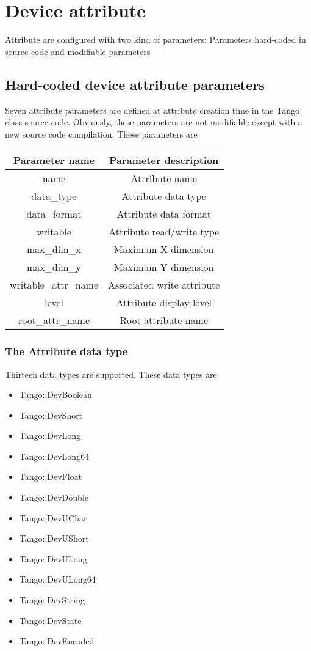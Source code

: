 \section{Device attribute}

Attribute are configured with two kind of parameters: Parameters hard-coded
in source code and modifiable parameters

\subsection{Hard-coded device attribute parameters}

Seven attribute parameters are defined at attribute
creation time in the Tango class source code. Obviously, these parameters
are not modifiable except with a new source code compilation. These
parameters are 

\vspace{0.3cm}

\begin{center}
\begin{longtable}{|c|c|}
\hline 
Parameter name & Parameter description\tabularnewline
\hline 
\hline 
name & Attribute name\tabularnewline
\hline 
data\_type & Attribute data type\tabularnewline
\hline 
data\_format & Attribute data format\tabularnewline
\hline 
writable\index{writable} & Attribute read/write type\tabularnewline
\hline 
max\_dim\_x & Maximum X dimension\tabularnewline
\hline 
max\_dim\_y & Maximum Y dimension\tabularnewline
\hline 
writable\_attr\_name\index{writable-attr-name} & Associated write attribute\tabularnewline
\hline 
level\index{level} & Attribute display level\tabularnewline
\hline 
root\_attr\_name & Root attribute name\tabularnewline
\hline 
\end{longtable}
\par\end{center}

\vspace{0.3cm}


\subsubsection{The Attribute data type}

Thirteen data types are supported. These data types are
\begin{itemize}
\item Tango::DevBoolean 
\item Tango::DevShort
\item Tango::DevLong
\item Tango::DevLong64
\item Tango::DevFloat
\item Tango::DevDouble
\item Tango::DevUChar
\item Tango::DevUShort
\item Tango::DevULong
\item Tango::DevULong64
\item Tango::DevString
\item Tango::DevState
\item Tango::DevEncoded
\end{itemize}

